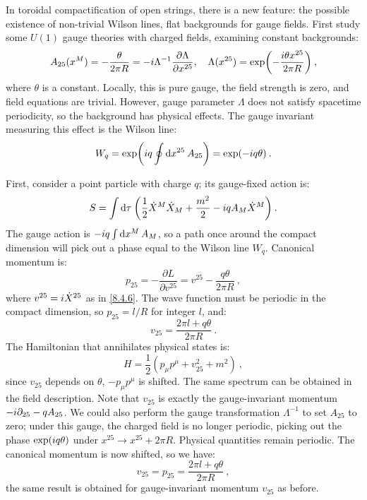 In toroidal compactification of open strings, there is a new feature: the possible existence of non-trivial Wilson lines, flat backgrounds for gauge fields. First study some $U(1)$ gauge theories with charged fields, examining constant backgrounds:
\begin{equation}
	A_{25}(x^{M})=-\frac{\theta}{2 \pi R}=-i \Lambda^{-1} \frac{\partial \Lambda}{\partial x^{25}}, \quad 
	\Lambda(x^{25})=\exp \biggl(-\frac{i \theta x^{25}}{2 \pi R}\biggr) \:, \label{8.6.1}
\end{equation}
where $\theta$ is a constant.
Locally, this is pure gauge, the field strength is zero, and field equations are trivial. However, gauge parameter $\Lambda$ does not satisfy spacetime periodicity, so the background has physical effects. 
The gauge invariant measuring this effect is the Wilson line:
\begin{equation}
	W_{q}=\exp \biggl(i q \oint \mathrm{d} x^{25}\: A_{25}\biggr)=\exp (-i q \theta) \:. \label{8.6.2}
\end{equation}

First, consider a point particle with charge $q$; its gauge-fixed action is:
\begin{equation}
	S=\int \mathrm{d} \tau \: \biggl(\frac{1}{2} \dot{X}^{M} \dot{X}_{M}+\frac{m^{2}}{2}-i q A_{M} \dot{X}^{M}\biggr) \:. \label{8.6.3}
\end{equation}
The gauge action is $-i q \int \mathrm{d} x^{M}\, A_{M}$, so a path once around the compact dimension will pick out a phase equal to the Wilson line $W_{q} $. Canonical momentum is:
\begin{equation}
	p_{25}=-\frac{\partial L}{\partial v^{25}}=v^{25}-\frac{q \theta}{2 \pi R} \:, \label{8.6.4}
\end{equation}
where $v^{25}=i \dot{X}^{25}$ as in \eqref{8.4.6}.
The wave function must be periodic in the compact dimension, so $p_{25}=l/R$ for integer $l$, and:
\begin{equation}
	v_{25}=\frac{2 \pi l+q \theta}{2 \pi R} \:. \label{8.6.5}
\end{equation}
The Hamiltonian that annihilates physical states is:
\begin{equation}
	H=\frac{1}{2} (p_{\mu} p^{\mu}+v_{25}^{2}+m^{2}) \:, \label{8.6.6}
\end{equation}
since $v_{25}$ depends on $\theta$, $-p_{\mu} p^{\mu}$ is shifted. The same spectrum can be obtained in the field description. 
Note that $v_{25}$ is exactly the gauge-invariant momentum $-i \partial_{25}-q A_{25}$. 
We could also perform the gauge transformation $\Lambda^{-1}$ to set $A_{25}$ to zero; under this gauge, the charged field is no longer periodic, 
picking out the phase $\exp (i q \theta)$ under $x^{25} \rightarrow x^{25}+2 \pi R$. Physical quantities remain periodic.
The canonical momentum is now shifted, so we have:
\begin{equation}
	v_{25}=p_{25}=\frac{2 \pi l+q \theta}{2 \pi R}\:, \label{8.6.7}
\end{equation}
the same result is obtained for gauge-invariant momentum $v_{25}$ as before.

